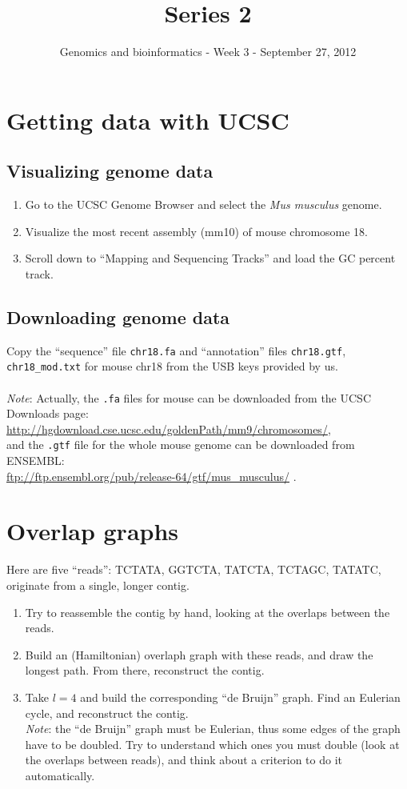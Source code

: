 \documentclass[a4paper,11pt]{article}
\title{Series 2}
\date{}
\author{Genomics and bioinformatics - Week 3 - September 27, 2012}
\begin{document}
\maketitle

\section{Getting data with UCSC}
\subsection{Visualizing genome data}
\begin{enumerate}
\item Go to the UCSC Genome Browser and select the \textit{Mus musculus} genome.
\item Visualize the most recent assembly (mm10) of mouse chromosome 18.
\item Scroll down to ``Mapping and Sequencing Tracks'' and load the GC percent track.
\end{enumerate}

\subsection{Downloading genome data}
Copy the ``sequence'' file \texttt{chr18.fa} and ``annotation'' files \texttt{chr18.gtf}, \texttt{chr18\_mod.txt} 
for mouse chr18 from the USB keys provided by us. \\\\
\textit{Note}: Actually, the \texttt{.fa} files for mouse can be downloaded from the UCSC Downloads page:\\
\url{http://hgdownload.cse.ucsc.edu/goldenPath/mm9/chromosomes/},\\
and the \texttt{.gtf} file for the whole mouse genome can be downloaded from ENSEMBL:\\
\url{ftp://ftp.ensembl.org/pub/release-64/gtf/mus_musculus/} .


\section{Overlap graphs}
Here are five ``reads'': TCTATA, GGTCTA, TATCTA, TCTAGC, TATATC, originate from a single, longer contig.
\begin{enumerate}
\item Try to reassemble the contig by hand, looking at the overlaps between the reads.
\item Build an (Hamiltonian) overlaph graph with these reads, and draw the longest path. 
From there, reconstruct the contig.
\item Take $l=4$ and build the corresponding ``de Bruijn'' graph. Find an Eulerian cycle, and reconstruct the contig. \\
\textit{Note}: the ``de Bruijn'' graph must be Eulerian, thus some edges of the graph have to be doubled.
Try to understand which ones you must double (look at the overlaps between reads), and think about a 
criterion to do it automatically.

\end{enumerate}
\end{document}
